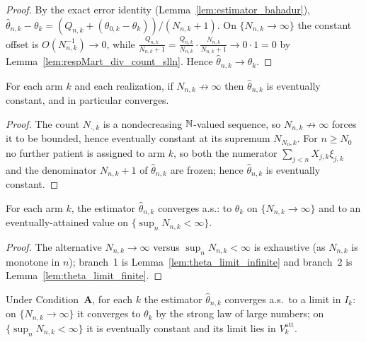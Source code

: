 \begin{proof}\leanok
{}
By the exact error identity (Lemma~\ref{lem:estimator_bahadur}),
$\hat\theta_{n,k}-\theta_k = (Q_{n,k}+(\theta_{0,k}-\theta_k))/(N_{n,k}+1)$. On
$\{N_{n,k}\to\infty\}$ the constant offset is $O(N_{n,k}^{-1})\to0$, while
$\frac{Q_{n,k}}{N_{n,k}+1} = \frac{Q_{n,k}}{N_{n,k}}\cdot\frac{N_{n,k}}{N_{n,k}+1}\to0\cdot1=0$
by Lemma~\ref{lem:respMart_div_count_slln}. Hence $\hat\theta_{n,k}\to\theta_k$.
\end{proof}

\begin{lemma}\label{lem:theta_limit_finite}
\leanok
{}
For each arm $k$ and each realization, if $N_{n,k}\not\to\infty$ then $\hat\theta_{n,k}$ is
eventually constant, and in particular converges.
\end{lemma}

\begin{proof}\leanok
The count $N_{\cdot,k}$ is a nondecreasing $\mathbb{N}$-valued sequence, so $N_{n,k}\not\to\infty$
forces it to be bounded, hence eventually constant at its supremum $N_{N_0,k}$. For $n\ge N_0$
no further patient is assigned to arm $k$, so both the numerator $\sum_{j<n}X_{j,k}\xi_{j,k}$
and the denominator $N_{n,k}+1$ of $\hat\theta_{n,k}$ are frozen; hence $\hat\theta_{n,k}$ is
eventually constant.
\end{proof}

\begin{lemma}\label{lem:theta_converges}
\leanok
{}
For each arm $k$, the estimator $\hat\theta_{n,k}$ converges a.s.: to $\theta_k$ on
$\{N_{n,k}\to\infty\}$ and to an eventually-attained value on $\{\sup_n N_{n,k}<\infty\}$.
\end{lemma}

\begin{proof}\leanok
{}
The alternative $N_{n,k}\to\infty$ versus $\sup_n N_{n,k}<\infty$ is exhaustive (as $N_{n,k}$
is monotone in $n$); branch~1 is Lemma~\ref{lem:theta_limit_infinite} and branch~2 is
Lemma~\ref{lem:theta_limit_finite}.
\end{proof}

\begin{lemma}\label{lem:theta_limit_dichotomy}
\leanok
{}
Under Condition~\textbf{A}, for each $k$ the estimator $\hat{\theta}_{n,k}$
converges a.s.\ to a limit in $I_k$: on $\{N_{n,k}\to\infty\}$ it converges to
$\theta_k$ by the strong law of large numbers; on $\{\sup_n N_{n,k} < \infty\}$
it is eventually constant and its limit lies in $V_k^{\mathrm{att}}$.
\end{lemma}

